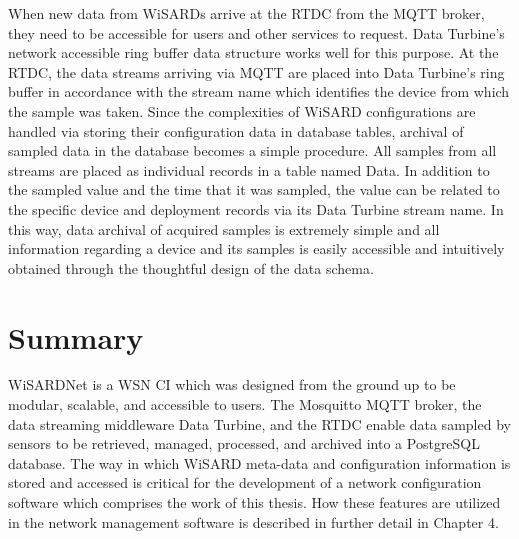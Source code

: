 When new data from WiSARDs arrive at the RTDC from the MQTT broker, they need to be accessible for users and other services to request. Data Turbine's network accessible ring buffer data structure works well for this purpose. At the RTDC, the data streams arriving via MQTT are placed into Data Turbine's ring buffer in accordance with the stream name which identifies the device from which the sample was taken. Since the complexities of WiSARD configurations are handled via storing their configuration data in database tables, archival of sampled data in the database becomes a simple procedure. All samples from all streams are placed as individual records in a table named Data. In addition to the sampled value and the time that it was sampled, the value can be related to the specific device and deployment records via its Data Turbine stream name. In this way, data archival of acquired samples is extremely simple and all information regarding a device and its samples is easily accessible and intuitively obtained through the thoughtful design of the data schema. 

\section{Summary}
WiSARDNet is a WSN CI which was designed from the ground up to be modular, scalable, and accessible to users. The Mosquitto MQTT broker, the data streaming middleware Data Turbine, and the RTDC enable data sampled by sensors to be retrieved, managed, processed, and archived into a PostgreSQL database. The way in which WiSARD meta-data and configuration information is stored and accessed is critical for the development of a network configuration software which comprises the work of this thesis. How these features are utilized in the network management software is described in further detail in Chapter 4.